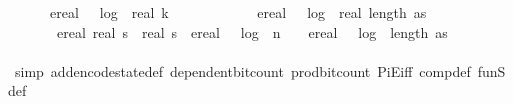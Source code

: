 \begin{isabellebody}
\ \ \ \ \ \ ereal\ {\isacharparenleft}{\kern0pt}{}\ {\isacharasterisk}{\kern0pt}\ log\ {}\ {\isacharparenleft}{\kern0pt}real\ k\ {\isacharplus}{\kern0pt}\ {}{\isacharparenright}{\kern0pt}\ {\isacharplus}{\kern0pt}\ {}{\isacharparenright}{\kern0pt}\ {\isacharplus}{\kern0pt}\ {\isacharparenleft}{\kern0pt}\isanewline
\ \ \ \ \ \ ereal\ {\isacharparenleft}{\kern0pt}{}\ {\isacharasterisk}{\kern0pt}\ log\ {}\ {\isacharparenleft}{\kern0pt}real\ {\isacharparenleft}{\kern0pt}length\ as{\isacharparenright}{\kern0pt}\ {\isacharplus}{\kern0pt}\ {}{\isacharparenright}{\kern0pt}\ {\isacharplus}{\kern0pt}\ {}{\isacharparenright}{\kern0pt}\ {\isacharplus}{\kern0pt}\ {\isacharparenleft}{\kern0pt}\isanewline
\ \ \ \ \ \ \ {\isacharparenleft}{\kern0pt}ereal\ {\isacharparenleft}{\kern0pt}real\ s\ {\isacharasterisk}{\kern0pt}\ real\ s\ {\isacharasterisk}{\kern0pt}\ {\isacharparenleft}{\kern0pt}{\isacharparenleft}{\kern0pt}ereal\ {\isacharparenleft}{\kern0pt}{}\ {\isacharasterisk}{\kern0pt}\ log\ {}\ {\isacharparenleft}{\kern0pt}{\isacharparenleft}{\kern0pt}n{\isacharparenright}{\kern0pt}{\isacharplus}{\kern0pt}{}{\isacharparenright}{\kern0pt}\ {\isacharplus}{\kern0pt}\ {}{\isacharparenright}{\kern0pt}\ {\isacharplus}{\kern0pt}\ ereal\ {\isacharparenleft}{\kern0pt}{}\ {\isacharasterisk}{\kern0pt}\ log\ {}\ {\isacharparenleft}{\kern0pt}{\isacharparenleft}{\kern0pt}length\ as{\isacharparenright}{\kern0pt}{\isacharplus}{\kern0pt}{}{\isacharparenright}{\kern0pt}\ {\isacharplus}{\kern0pt}\ {}{\isacharparenright}{\kern0pt}{\isacharparenright}{\kern0pt}\ {\isacharplus}{\kern0pt}\ {}{\isacharparenright}{\kern0pt}{\isacharparenright}{\kern0pt}{\isacharplus}{\kern0pt}\ {}{\isacharparenright}{\kern0pt}{\isacharparenright}{\kern0pt}{\isacharparenright}{\kern0pt}{\isacharparenright}{\kern0pt}{\isachardoublequoteclose}\isanewline
\ \ \ \ \ \ \isamarkupfalse%
\ {\isacharparenleft}{\kern0pt}simp\ add{\isacharcolon}{\kern0pt}encode{\isacharunderscore}{\kern0pt}state{\isacharunderscore}{\kern0pt}def\ dependent{\isacharunderscore}{\kern0pt}bit{\isacharunderscore}{\kern0pt}count\ prod{\isacharunderscore}{\kern0pt}bit{\isacharunderscore}{\kern0pt}count\ PiE{\isacharunderscore}{\kern0pt}iff\ comp{\isacharunderscore}{\kern0pt}def\ fun\isactrlsub S{\isacharunderscore}{\kern0pt}def\isanewline

\end{isabellebody}
